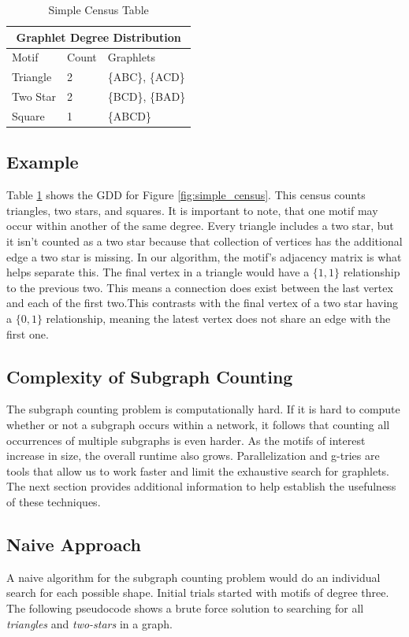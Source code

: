 \documentclass[12pt,twoside]{reedthesis}
\begin{document}
\begin{table}[h!]
\begin{tabular}{ |p{3cm}|p{3cm}|p{3cm}| }
	 \hline
 	\multicolumn{3}{|c|}{Graphlet Degree Distribution} \\
 	\hline
	Motif& Count &Graphlets\\
 	\hline
 	Triangle   & 2    &\{ABC\}, \{ACD\}\\
 	Two Star&   2  & \{BCD\}, \{BAD\}  \\
 	Square &1 &\{ABCD\}  \\
	 \hline
\end{tabular}
 \caption{Simple Census Table}
\label{table:simple_census}
\end{table}

	\subsection{Example}
Table \ref{table:simple_census} shows the GDD for Figure \ref{fig:simple_census}. This census counts triangles, two stars, and squares. It is important to note, that one motif may occur within another of the same degree. Every triangle includes a two star, but it isn't counted as a two star because that collection of vertices has the additional edge a two star is missing. In our algorithm, the motif's adjacency matrix is what helps separate this. The final vertex in a triangle would have a $\{1,1\}$ relationship to the previous two. This means a connection does exist between the last vertex and each of the first two.This contrasts with the final vertex of a two star having a $\{0,1\}$ relationship, meaning the latest vertex does not share an edge with the first one.

\subsection{Complexity of Subgraph Counting}
The subgraph counting problem is computationally hard. If it is hard to compute whether or not a subgraph occurs within a network, it follows that counting all occurrences of multiple subgraphs is even harder. As the motifs of interest increase in size, the overall runtime also grows. Parallelization and g-tries are tools that allow us to work faster and limit the exhaustive search for graphlets. The next section provides additional information to help establish the usefulness of these techniques.
	
\subsection{Naive Approach}
A naive algorithm for the subgraph counting problem would do an individual search for each possible shape. Initial trials started with motifs of degree three. The following pseudocode shows a brute force solution to searching for all \textit{triangles} and \textit{two-stars} in a graph.
\end{document}
